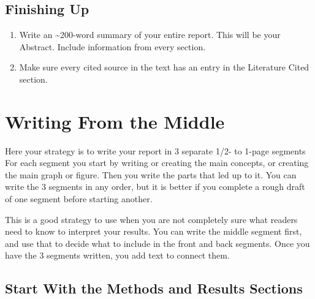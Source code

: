 \documentclass[
]{book}
\begin{document}
\hypertarget{finishing-up}{%
\subsection*{Finishing Up}\label{finishing-up}}

\begin{enumerate}
\def\labelenumi{\arabic{enumi}.}
\setcounter{enumi}{11}
\item
  Write an \textasciitilde200-word summary of your entire report. This will be your Abstract. Include information from every section.
\item
  Make sure every cited source in the text has an entry in the Literature Cited section.
\end{enumerate}

\hypertarget{writing-from-the-middle}{%
\section{Writing From the Middle}\label{writing-from-the-middle}}

Here your strategy is to write your report in 3 separate 1/2- to 1-page segments For each segment you start by writing or creating the main concepts, or creating the main graph or figure. Then you write the parts that led up to it. You can write the 3 segments in any order, but it is better if you complete a rough draft of one segment before starting another.

This is a good strategy to use when you are not completely sure what readers need to know to interpret your results. You can write the middle segment first, and use that to decide what to include in the front and back segments. Once you have the 3 segments written, you add text to connect them.

\hypertarget{start-with-the-methods-and-results-sections}{%
\subsection*{Start With the Methods and Results Sections}\label{start-with-the-methods-and-results-sections}}
\end{document}

